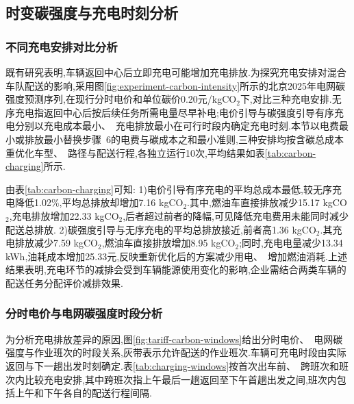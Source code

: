\documentclass{setp-new}
\begin{document}
\subsection{时变碳强度与充电时刻分析}

\subsubsection{不同充电安排对比分析}

既有研究表明,车辆返回中心后立即充电可能增加充电排放\cite{ref:52,ref:woody2021}.为探究充电安排对混合车队配送的影响,采用图\ref{fig:experiment-carbon-intensity}所示的北京2025年电网碳强度预测序列\cite{ref:82},在现行分时电价和单位碳价0.20元/kgCO$_2$下,对比三种充电安排.无序充电指返回中心后按后续任务所需电量尽早补电;电价引导与碳强度引导有序充电分别以充电成本最小、~充电排放最小在可行时段内确定充电时刻.本节以电费最小或排放最小替换步骤~6的电费与碳成本之和最小准则,三种安排均按含碳总成本重优化车型、~路径与配送行程,各独立运行10次,平均结果如表\ref{tab:carbon-charging}所示.

\begingroup
\small
\noindent\begin{minipage}{\linewidth}
\centering
{}\label{tab:carbon-charging}

\end{minipage}
\par\endgroup

由表\ref{tab:carbon-charging}可知: 1)电价引导有序充电的平均总成本最低,较无序充电降低1.02\%,平均总排放却增加7.16 kgCO$_2$.其中,燃油车直接排放减少15.17 kgCO$_2$,充电排放增加22.33 kgCO$_2$,后者超过前者的降幅,可见降低充电费用未能同时减少配送总排放. 2)碳强度引导与无序充电的平均总排放接近,前者高1.36 kgCO$_2$.其充电排放减少7.59 kgCO$_2$,燃油车直接排放增加8.95 kgCO$_2$;同时,充电电量减少13.34 kWh,油耗成本增加25.33元,反映重新优化后的方案减少用电、~增加燃油消耗.上述结果表明,充电环节的减排会受到车辆能源使用变化的影响,企业需结合两类车辆的配送任务分配评价减排效果.

\subsubsection{分时电价与电网碳强度时段分析}

为分析充电排放差异的原因,图\ref{fig:tariff-carbon-windows}给出分时电价、~电网碳强度与作业班次的时段关系,灰带表示允许配送的作业班次.车辆可充电时段由实际返回与下一趟出发时刻确定.表\ref{tab:charging-windows}按首次出车前、~跨班次和班次内比较充电安排,其中跨班次指上午最后一趟返回至下午首趟出发之间,班次内包括上午和下午各自的配送行程间隔.
\end{document}
